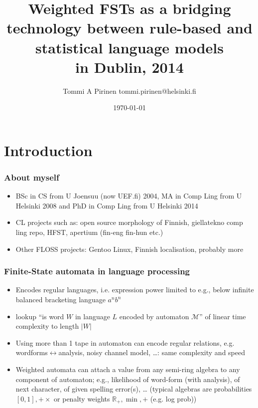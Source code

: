 \documentclass{beamer}
\title{Weighted FSTs as a bridging technology between rule-based and statistical
    language models\\
\scriptsize{in Dublin, 2014}}
\author{Tommi A Pirinen \scriptsize \guilsinglleft{}tommi.pirinen@helsinki.fi\guilsinglright{}}
\institute{Dublin City University\\Abu-matran}
\date{\today}
\begin{document}

\maketitle


\section{Introduction}

\begin{frame}
    \frametitle{About myself}
    \begin{itemize}
        \item BSc in CS from U Joensuu (now UEF.fi) 2004, 
            MA in Comp Ling from U Helsinki 2008
            and PhD in Comp Ling from U Helsinki 2014
        \item CL projects such as:
            open source morphology of Finnish,
            giellatekno comp ling repo,
            HFST,
            apertium (fin-eng fin-hun etc.)
        \item Other FLOSS projects:
            Gentoo Linux,
            Finnish localisation,
            probably more
    \end{itemize}
\end{frame}

\begin{frame}
    \frametitle{Finite-State automata in language processing}
    \begin{itemize}
        \item Encodes regular languages, i.e. expression power limited to e.g.,
            below infinite balanced bracketing language $a^n b^n$
        \item lookup ``is word $W$ in language $L$ encoded by automaton
            $\mathcal{M}$'' of linear time complexity to length $|W|$
        \item Using more than 1 tape in automaton can encode regular relations,
            e.g. wordforms$\leftrightarrow$analysis, noisy channel model,
            \ldots: same complexity and speed
        \item Weighted automata can attach a value from any semi-ring algebra to
            any component of automaton; e.g., likelihood of word-form (with
            analysis), of next character, of given spelling error(s), \ldots
            (typical algebras are probabilities $[0, 1], + \times$ or
            penalty weights $\mathbb{R}_+, \min, +$ (e.g. log prob))
    \end{itemize}
\end{frame}
\end{document}
